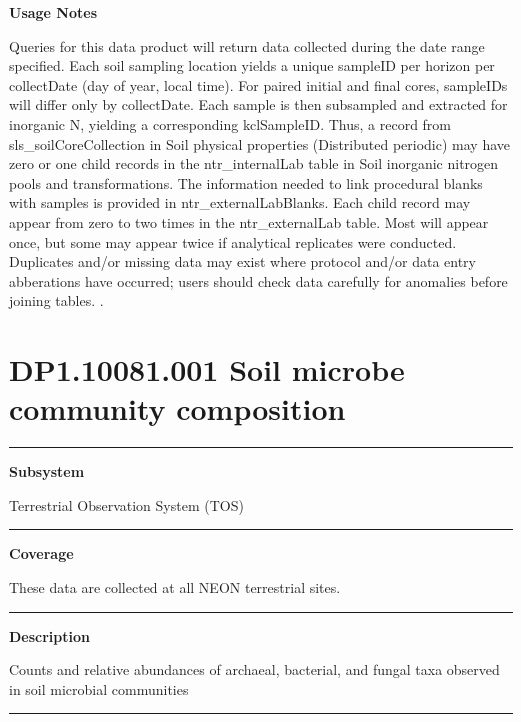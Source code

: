 \documentclass[]{article}
\begin{document}
\textbf{Usage Notes}

Queries for this data product will return data collected during the date
range specified. Each soil sampling location yields a unique sampleID
per horizon per collectDate (day of year, local time). For paired
initial and final cores, sampleIDs will differ only by collectDate. Each
sample is then subsampled and extracted for inorganic N, yielding a
corresponding kclSampleID. Thus, a record from sls\_soilCoreCollection
in Soil physical properties (Distributed periodic) may have zero or one
child records in the ntr\_internalLab table in Soil inorganic nitrogen
pools and transformations. The information needed to link procedural
blanks with samples is provided in ntr\_externalLabBlanks. Each child
record may appear from zero to two times in the ntr\_externalLab table.
Most will appear once, but some may appear twice if analytical
replicates were conducted. Duplicates and/or missing data may exist
where protocol and/or data entry abberations have occurred; users should
check data carefully for anomalies before joining tables. \newpage
.

\section{DP1.10081.001 Soil microbe community
composition}\label{dp1.10081.001-soil-microbe-community-composition}

\begin{center}\rule{0.5\linewidth}{\linethickness}\end{center}

\textbf{Subsystem}

Terrestrial Observation System (TOS)

\begin{center}\rule{0.5\linewidth}{\linethickness}\end{center}

\textbf{Coverage}

These data are collected at all NEON terrestrial sites.

\begin{center}\rule{0.5\linewidth}{\linethickness}\end{center}

\textbf{Description}

Counts and relative abundances of archaeal, bacterial, and fungal taxa
observed in soil microbial communities

\begin{center}\rule{0.5\linewidth}{\linethickness}\end{center}
\end{document}
